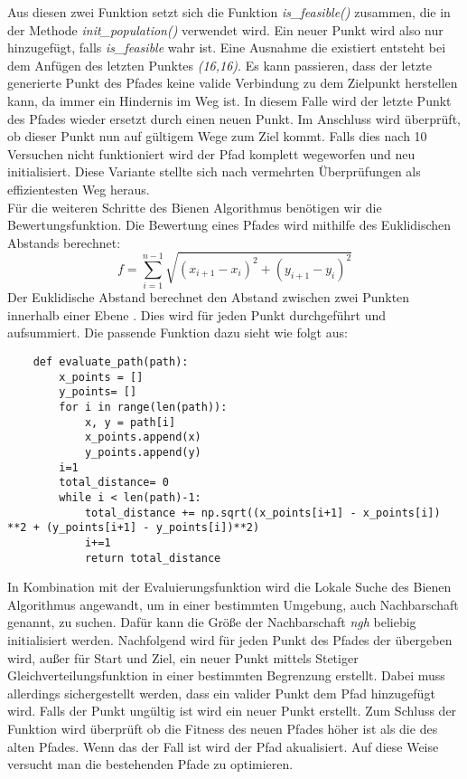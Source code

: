 Aus diesen zwei Funktion setzt sich die Funktion \emph{is\_feasible()} zusammen, die in der Methode \emph{init\_population()} verwendet wird. Ein neuer Punkt wird also nur hinzugefügt, falls \emph{is\_feasible} wahr ist. Eine Ausnahme die existiert entsteht bei dem Anfügen des letzten Punktes \emph{(16,16)}. Es kann passieren, dass der letzte generierte Punkt des Pfades keine valide Verbindung zu dem Zielpunkt herstellen kann, da immer ein Hindernis im Weg ist. In diesem Falle wird der letzte Punkt des Pfades wieder ersetzt durch einen neuen Punkt. Im Anschluss wird überprüft, ob dieser Punkt nun auf gültigem Wege zum Ziel kommt. Falls dies nach 10 Versuchen nicht funktioniert wird der Pfad komplett wegeworfen und neu initialisiert. Diese Variante stellte sich nach vermehrten Überprüfungen als effizientesten Weg heraus.\\

Für die weiteren Schritte des Bienen Algorithmus benötigen wir die Bewertungsfunktion. Die Bewertung eines Pfades wird mithilfe des Euklidischen Abstands berechnet:
\[f = \sum_{i=1}^{n-1} \sqrt{(x_{i+1} - x_i)^2 + (y_{i+1} - y_i)^2}\]
Der Euklidische Abstand berechnet den Abstand zwischen zwei Punkten innerhalb einer Ebene \cite{Friedrich2019}. Dies wird für jeden Punkt durchgeführt und aufsummiert. Die passende Funktion dazu sieht wie folgt aus:

\begin{verbatim}
    def evaluate_path(path):
        x_points = []
        y_points= []
        for i in range(len(path)):
            x, y = path[i]
            x_points.append(x)
            y_points.append(y)
        i=1
        total_distance= 0
        while i < len(path)-1:
            total_distance += np.sqrt((x_points[i+1] - x_points[i]) **2 + (y_points[i+1] - y_points[i])**2)
            i+=1
            return total_distance
\end{verbatim}
\vspace*{-3mm}
\vspace*{3mm}

In Kombination mit der Evaluierungsfunktion wird die Lokale Suche des Bienen Algorithmus angewandt, um in einer bestimmten Umgebung, auch Nachbarschaft genannt, zu suchen. Dafür kann die Größe der Nachbarschaft \emph{ngh} beliebig initialisiert werden. Nachfolgend wird für jeden Punkt des Pfades der übergeben wird, außer für Start und Ziel, ein neuer Punkt mittels Stetiger Gleichverteilungsfunktion in einer bestimmten Begrenzung erstellt. Dabei muss allerdings sichergestellt werden, dass ein valider Punkt dem Pfad hinzugefügt wird. Falls der Punkt ungültig ist wird ein neuer Punkt erstellt. Zum Schluss der Funktion wird überprüft ob die Fitness des neuen Pfades höher ist als die des alten Pfades. Wenn das der Fall ist wird der Pfad akualisiert. Auf diese Weise versucht man die bestehenden Pfade zu optimieren.   

